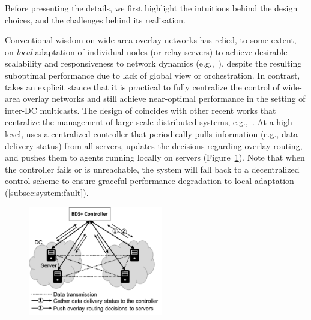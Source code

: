  Before presenting the details, we first highlight the intuitions behind the design choices, and the challenges behind its realisation.


Conventional wisdom on wide-area overlay networks has relied, to
some extent, on {\em local} adaptation of individual nodes (or
relay servers) to achieve desirable scalability and responsiveness
to network dynamics
(e.g.,~\cite{Andreev2013Designing,Repantis2010Scaling,Huang2014A,mukerjee2014enabling}),
despite the resulting suboptimal performance due to lack of global
view or orchestration.
In contrast, \name takes an explicit stance that it is practical to
fully centralize the control of wide-area overlay networks and
still achieve near-optimal performance in the setting of inter-DC
multicasts. The design of \name coincides with other recent works that centralize the
management of large-scale distributed systems, e.g.,~\cite{gog2016firmament}.
At a high level, \name uses a centralized controller that
periodically pulls information (e.g., data delivery status) from all
servers, updates the decisions regarding overlay routing, and pushes
them to agents running locally on servers
(Figure~\ref{fig:framework}).
Note that when the controller fails or is unreachable, the system will
fall back to a decentralized control scheme to ensure graceful
performance degradation to local adaptation
(\Section\ref{subsec:system:fault}).

\begin{figure}[t]
  \centering
  \includegraphics[width=2.3in]{images/framework-journal.pdf}
    \vspace{-0.2cm}
  \label{fig:framework}
\vspace{-0.4cm}
\end{figure}

